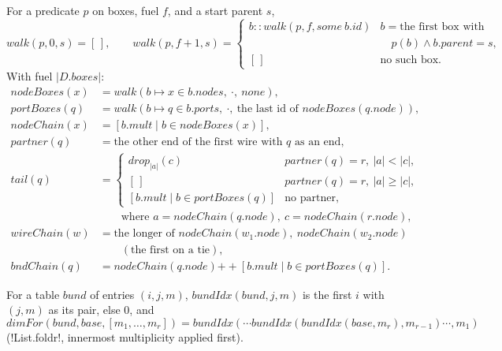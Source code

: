 {\begin{definition}\label{def:boxes-walk}
For a predicate $p$ on boxes, fuel $f$, and a start parent $s$,
\[
\mathit{walk}(p,0,s)=[\,],\qquad \mathit{walk}(p,f{+}1,s)=\begin{cases}b::\mathit{walk}(p,f,\mathit{some}\ b.\mathit{id}) & b=\text{the first box with}\\ & \quad p(b)\wedge b.\mathit{parent}=s,\\ [\,]&\text{no such box.}\end{cases}
\]
With fuel $|D.\mathit{boxes}|$:
\begin{align*}
\mathit{nodeBoxes}(x)&=\mathit{walk}(b\mapsto x\in b.\mathit{nodes},\ \cdot,\ \mathit{none}),\\
\mathit{portBoxes}(q)&=\mathit{walk}(b\mapsto q\in b.\mathit{ports},\ \cdot,\ \text{the last id of } \mathit{nodeBoxes}(q.\mathit{node})),\\
\mathit{nodeChain}(x)&=[b.\mathit{mult}\mid b\in\mathit{nodeBoxes}(x)],\\
\mathit{partner}(q)&=\text{the other end of the first wire with } q \text{ as an end},\\
\mathit{tail}(q)&=\begin{cases}\mathit{drop}_{|a|}(c) & \mathit{partner}(q)=r,\ |a|<|c|,\\ [\,] & \mathit{partner}(q)=r,\ |a|\ge|c|,\\ [b.\mathit{mult}\mid b\in\mathit{portBoxes}(q)] & \text{no partner,}\end{cases}\\
&\qquad\text{where } a=\mathit{nodeChain}(q.\mathit{node}),\ c=\mathit{nodeChain}(r.\mathit{node}),\\
\mathit{wireChain}(w)&=\text{the longer of } \mathit{nodeChain}(w_1.\mathit{node}),\ \mathit{nodeChain}(w_2.\mathit{node})\\
&\qquad(\text{the first on a tie}),\\
\mathit{bndChain}(q)&=\mathit{nodeChain}(q.\mathit{node})\mathbin{+\!\!+}[b.\mathit{mult}\mid b\in\mathit{portBoxes}(q)].
\end{align*}
\end{definition}

\begin{definition}\label{def:boxes-dimFor}
For a table $\mathit{bund}$ of entries $(i,j,m)$, $\mathit{bundIdx}(\mathit{bund},j,m)$ is the first $i$ with $(j,m)$ as its pair, else $0$, and
\[
\mathit{dimFor}(\mathit{bund},\mathit{base},[m_1,\dots,m_r])=\mathit{bundIdx}(\cdots\mathit{bundIdx}(\mathit{bundIdx}(\mathit{base},m_r),m_{r-1})\cdots,m_1)
\]
(\lbx!List.foldr!, innermost multiplicity applied first).
\end{definition}

}

